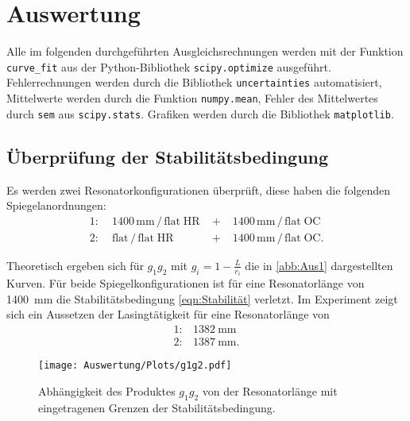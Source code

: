 \section{Auswertung}
Alle im folgenden durchgeführten Ausgleichsrechnungen werden mit der Funktion
\texttt{curve\_fit} aus der Python\cite{python}-Bibliothek
\texttt{scipy.optimize}\cite{scipy} ausgeführt.
Fehlerrechnungen werden durch die Bibliothek \texttt{uncertainties}\cite{uncertainties} automatisiert,
Mittelwerte werden durch die Funktion \texttt{numpy.mean}\cite{numpy}, Fehler des Mittelwertes
durch \texttt{sem} aus \texttt{scipy.stats}.
Grafiken werden durch die Bibliothek \texttt{matplotlib}\cite{matplotlib}.

\subsection{Überprüfung der Stabilitätsbedingung}
Es werden zwei Resonatorkonfigurationen überprüft, diese haben die folgenden
Spiegelanordnungen:
\begin{align*}
  1: &\; 1400\,\text{mm}\,/\,\text{flat} \; \text{HR} \; &+& \; 1400\,\text{mm}\,/\,\text{flat} \; \text{OC}\\
  2: &\; \text{flat}\,/\,\text{flat} \; \text{HR} \; &+& \; 1400\,\text{mm}\,/\,\text{flat} \; \text{OC}.
\end{align*}

Theoretisch ergeben sich für $g_1 g_2$ mit $g_i = 1 - \frac{L}{r_i}$ die in
\autoref{abb:Aus1} dargestellten Kurven.
Für beide Spiegelkonfigurationen ist für eine Resonatorlänge von \SI{1400}{\milli\metre}
die Stabilitätsbedingung \autoref{eqn:Stabilität} verletzt.
Im Experiment zeigt sich ein Aussetzen der Lasingtätigkeit für eine Resonatorlänge von
\begin{align*}
  1: & \SI{1382}{\milli\metre}\\
  2: & \SI{1387}{\milli\metre}.
\end{align*}

\begin{figure}[h]
  \centering
  \texttt{[image: Auswertung/Plots/g1g2.pdf]}
  \caption{Abhängigkeit des Produktes $g_1 g_2$ von der Resonatorlänge mit eingetragenen
  Grenzen der Stabilitätsbedingung.}
  \label{abb:Aus1}
\end{figure}

